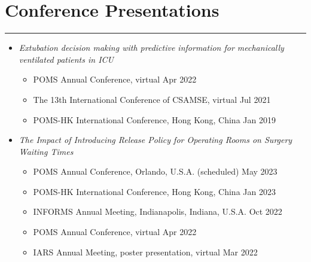 \documentclass[12pt, a4paper]{article}
\begin{document}
{\begin{enumerate}[leftmargin=28pt, itemsep=6pt, parsep=0.2pt, topsep=1pt]
\end{enumerate}




\section*{Conference Presentations}
\vspace*{0.4em}
\hrule height 0.5pt
\begin{itemize}[leftmargin=26pt, itemsep=8pt, parsep=0.2pt, topsep=1pt]

	\item {\it Extubation decision making with predictive information for mechanically ventilated patients in ICU}
	\begin{itemize}[leftmargin=14pt, itemsep=4pt, topsep=2pt]
		\item POMS Annual Conference, virtual \hfill Apr 2022
		\item The 13th International Conference of CSAMSE, virtual \hfill Jul 2021
		\item POMS-HK International Conference, Hong Kong, China \hfill Jan 2019
	\end{itemize}

	\item {\it The Impact of Introducing Release Policy for Operating Rooms on Surgery Waiting Times}
	\begin{itemize}[leftmargin=14pt, itemsep=2pt, topsep=2pt]
		\item POMS Annual Conference, Orlando, U.S.A. (scheduled) \hfill May 2023
		\item POMS-HK International Conference, Hong Kong, China \hfill Jan 2023
		\item INFORMS Annual Meeting, Indianapolis, Indiana, U.S.A. \hfill Oct 2022
		\item POMS Annual Conference, virtual \hfill Apr 2022
		\item IARS Annual Meeting, poster presentation, virtual \hfill Mar 2022
	\end{itemize}

\end{itemize}




}
\end{document}
